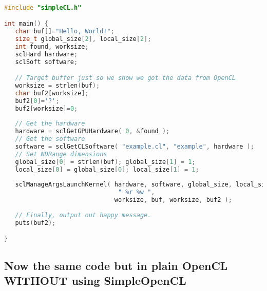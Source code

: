 \documentclass{article}
\begin{document}
\begin{lstlisting}[language=c]

#include "simpleCL.h"

int main() {
   char buf[]="Hello, World!";
   size_t global_size[2], local_size[2];
   int found, worksize;
   sclHard hardware;
   sclSoft software;

   // Target buffer just so we show we got the data from OpenCL
   worksize = strlen(buf);
   char buf2[worksize];
   buf2[0]='?';
   buf2[worksize]=0;
    
   // Get the hardware
   hardware = sclGetGPUHardware( 0, &found );
   // Get the software
   software = sclGetCLSoftware( "example.cl", "example", hardware );
   // Set NDRange dimensions
   global_size[0] = strlen(buf); global_size[1] = 1;
   local_size[0] = global_size[0]; local_size[1] = 1;
    
   sclManageArgsLaunchKernel( hardware, software, global_size, local_size,
                               " %r %w ",
                              worksize, buf, worksize, buf2 );
    
   // Finally, output out happy message.
   puts(buf2);

}
\end{lstlisting}

\subsection{Now the same code but in plain OpenCL WITHOUT using SimpleOpenCL}
\end{document}
